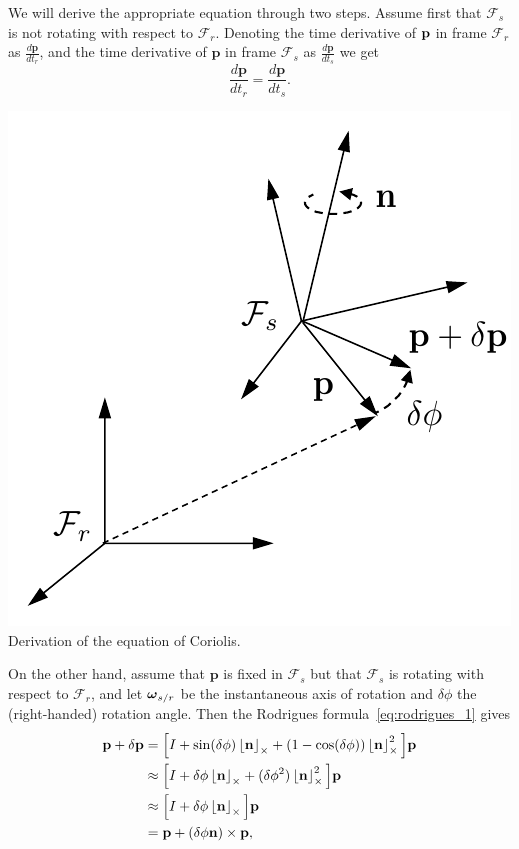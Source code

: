 We will derive the appropriate equation through two steps.  Assume
first that $\mathcal{F}_s$ is not rotating with respect to
$\mathcal{F}_r$.  Denoting the time derivative of $\mathbf{p}$ in
frame $\mathcal{F}_r$ as $\frac{d\mathbf{p}}{dt_r}$, and the time derivative of $\mathbf{p}$ in
frame $\mathcal{F}_s$ as $\frac{d\mathbf{p}}{dt_s}$ we get
\begin{equation}\label{eq:coriolis1}
\frac{d\mathbf{p}}{dt_r} = \frac{d\mathbf{p}}{dt_s}.
\end{equation}
\begin{marginfigure}
  \includegraphics[width=\linewidth]{chap2_preliminaries/figures/coriolis_formula}\\
  \caption{Derivation of the equation of Coriolis.}
  \label{fig:coriolis_formula}
\end{marginfigure}
On the other hand, assume that $\mathbf{p}$ is fixed in
$\mathcal{F}_s$ but that $\mathcal{F}_s$ is rotating with respect to
$\mathcal{F}_r$, and let $\boldsymbol{\omega}_{s/r}$ be the instantaneous axis of
rotation and $\delta\phi$ the (right-handed) rotation angle.  Then
the Rodrigues formula~\eqref{eq:rodrigues_1} gives
\begin{align*}
\mathbf{p}+\delta\mathbf{p} 
	&=\Big[I + \sin(\delta\phi)\left\lfloor\mathbf{n}\right\rfloor_{\times} + (1-\cos(\delta\phi))\left\lfloor\mathbf{n}\right\rfloor_{\times}^2\Big]\mathbf{p} \\
	&\approx \Big[I + \delta\phi \left\lfloor\mathbf{n}\right\rfloor_{\times} + (\delta\phi^2)\left\lfloor\mathbf{n}\right\rfloor_{\times}^2\Big]\mathbf{p} \\
	&\approx \Big[I + \delta\phi \left\lfloor\mathbf{n}\right\rfloor_{\times}\Big]\mathbf{p} \\
	&= \mathbf{p} + (\delta\phi\mathbf{n})\times \mathbf{p},
\end{align*}
